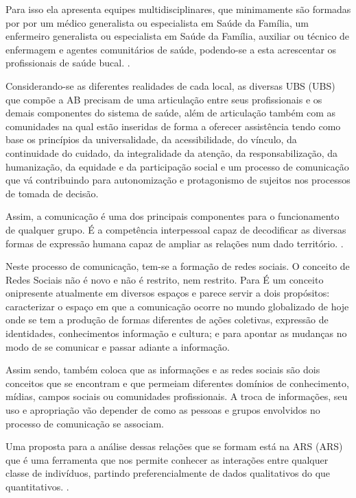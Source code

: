 Para isso ela apresenta equipes multidisciplinares, que minimamente são formadas por por um médico generalista ou especialista em Saúde da Família, um enfermeiro generalista ou especialista em Saúde da Família, auxiliar ou técnico de enfermagem e agentes comunitários de saúde, podendo-se a esta acrescentar os profissionais de saúde bucal. \cite{ministerio2012politica}.

Considerando-se as diferentes realidades de cada local, as diversas \acrlong{UBS} (\acrshort{UBS}) que compõe a \acrshort{AB} precisam de uma articulação entre seus profissionais e os demais componentes do sistema de saúde, além de articulação também com as comunidades na qual estão inseridas de forma a oferecer assistência tendo como base os princípios da universalidade, da acessibilidade, do vínculo, da continuidade do cuidado, da integralidade da atenção, da responsabilização, da humanização, da equidade e da participação social e um processo de comunicação que vá contribuindo para autonomização e protagonismo de sujeitos nos processos de tomada de decisão.

Assim, a comunicação é uma dos principais componentes para o funcionamento de qualquer grupo. É a competência interpessoal capaz de decodificar as diversas formas de expressão humana capaz de ampliar as relações num dado território. \cite{rocha2013avaliaccao}.

Neste processo de comunicação, tem-se a formação de redes sociais. O conceito de Redes Sociais não é novo e não é restrito, nem restrito. Para \cite{marteleto2010redes} É um conceito onipresente atualmente em diversos espaços e parece servir a dois propósitos: caracterizar o espaço em que a comunicação ocorre no mundo globalizado de hoje onde se tem a produção de formas diferentes de ações coletivas, expressão de identidades, conhecimentos informação e cultura; e para apontar as mudanças no modo de se comunicar e passar adiante a informação.

Assim sendo, \cite{marteleto2010redes} também coloca que as informações e as redes sociais são dois conceitos que se encontram e que permeiam diferentes domínios de conhecimento, mídias, campos sociais ou comunidades profissionais. A troca de informações, seu uso e apropriação vão depender de como as pessoas e grupos envolvidos no processo de comunicação se associam.

Uma proposta para a análise dessas relações que se formam está na \acrlong{ARS} (\acrshort{ARS}) que é uma ferramenta que nos permite conhecer as interações entre qualquer classe de indivíduos, partindo preferencialmente de dados qualitativos do que quantitativos. \cite{alejandro2005manual}.

